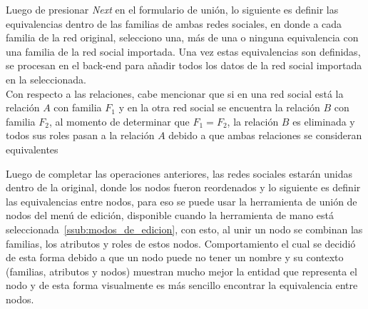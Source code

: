 
Luego de presionar \emph{Next} en el formulario de unión, lo siguiente es definir las equivalencias dentro de las familias de ambas redes sociales, en donde a cada familia de la red original, selecciono una, más de una o ninguna equivalencia con una familia de la red social importada. Una vez estas equivalencias son definidas, se procesan en el back-end para añadir todos los datos de la red social importada en la seleccionada.\\


Con respecto a las relaciones, cabe mencionar que si en una red social está la relación $A$ con familia $F_1$ y en la otra red social se encuentra la relación $B$ con familia $F_2$, al momento de determinar que $F_1 = F_2$, la relación $B$ es eliminada y todos sus roles pasan a la relación $A$ debido a que ambas relaciones se consideran equivalentes

Luego de completar las operaciones anteriores, las redes sociales estarán unidas dentro de la original, donde los nodos fueron reordenados y lo siguiente es definir las equivalencias entre nodos, para eso se puede usar la herramienta de unión de nodos del menú de edición, disponible cuando la herramienta de mano está seleccionada~\ref{ssub:modos_de_edicion}, con esto, al unir un nodo se combinan las familias, los atributos y roles de estos nodos. Comportamiento el cual se decidió de esta forma debido a que un nodo puede no tener un nombre y su contexto (familias, atributos y nodos) muestran mucho mejor la entidad que representa el nodo y de esta forma visualmente es más sencillo encontrar la equivalencia entre nodos.



% 
